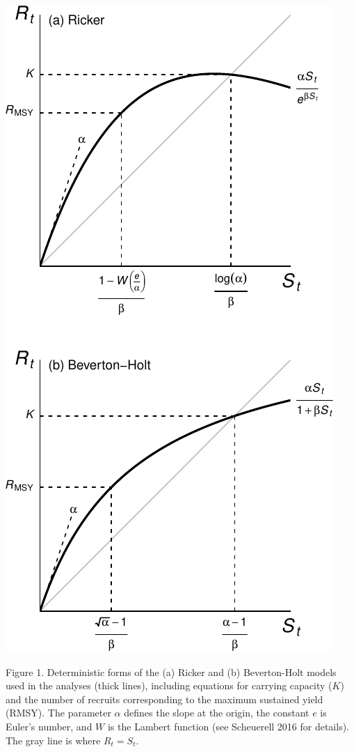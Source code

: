 \documentclass[11pt,]{article}
\begin{document}
\begin{center}\includegraphics{App_3_Summarize_results_files/figure-latex/fig_1_model_forms-1} \end{center}

Figure 1. Deterministic forms of the (a) Ricker and (b) Beverton-Holt
models used in the analyses (thick lines), including equations for
carrying capacity (\(K\)) and the number of recruits corresponding to
the maximum sustained yield (RMSY). The parameter \(\alpha\) defines the
slope at the origin, the constant \(e\) is Euler's number, and \(W\) is
the Lambert function (see Scheuerell 2016 for details). The gray line is
where \(R_t = S_t\).
\end{document}
